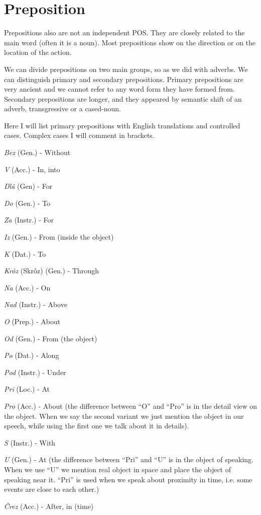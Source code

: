 \section{Preposition}

Prepositions also are not an independent POS. They are closely related to the main word (often it is a noun). Most prepositions show on the direction or on the location of the action. 

We can divide prepositions on two main groups, so as we did with adverbs. We can distinguish primary and secondary prepositions. Primary prepositions are very ancient and we cannot refer to any word form they have formed from. Secondary prepositions are longer, and they appeared by semantic shift of an adverb, transgressive or a cased-noun. 

Here I will list primary prepositions with English translations and controlled cases. Complex cases I will comment in brackets.

\textit{Bez} (Gen.) - Without

\textit{V} (Acc.) - In, into

\textit{Dlä} (Gen) - For

\textit{Do} (Gen.) - To

\textit{Za} (Instr.) - For

\textit{Iz} (Gen.) - From (inside the object)

\textit{K} (Dat.) - To

\textit{Krôz} (Skrôz) (Gen.) - Through

\textit{Na} (Acc.) - On

\textit{Nad} (Instr.) - Above

\textit{O} (Prep.) - About

\textit{Od} (Gen.) - From (the object)

\textit{Po} (Dat.) - Along

\textit{Pod} (Instr.) - Under

\textit{Pri} (Loc.) - At

\textit{Pro} (Acc.) - About (the difference between “O” and “Pro” is in the detail view on the object. When we say the second variant we just mention the object in our speech, while using the first one we talk about it in details).

\textit{S} (Instr.) - With

\textit{U} (Gen.) - At (the difference between “Pri” and “U” is in the object of speaking. When we use “U” we mention real object in space and place the object of speaking near it. “Pri” is used when we speak about proximity in time, i.e. some events are close to each other.)

\textit{Črez} (Acc.) - After,  in (time)
